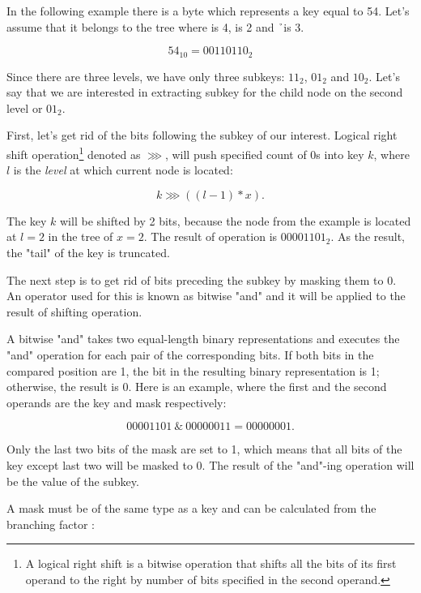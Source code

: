 In the following example there is a byte which represents a key equal to 54. Let's assume that it belongs to the tree where \m{} is 4, \x{} is 2 and \h\ is 3.

\begin{equation}
    54_{10} = 00110110_2
\end{equation}

Since there are three levels, we have only three subkeys: $11_2$, $01_2$ and $10_2$. Let's say that we are interested in extracting subkey for the child node on the second level or $01_2$.

First, let's get rid of the bits following the subkey of our interest. Logical right shift operation\footnote{A logical right shift is a bitwise operation that shifts all the bits of its first operand to the right by number of bits specified in the second operand.} denoted as $\ggg$, will push specified count of 0s into key $k$, where $l$ is the \emph{level} at which current node is located:

\begin{equation}
    k \ggg ((l - 1) * x).
\end{equation}

The key $k$ will be shifted by 2 bits, because the node from the example is located at $l = 2$ in the tree of $x = 2$. The result of operation is $00001101_2$. As the result, the "tail" of the key is truncated.

The next step is to get rid of bits preceding the subkey by masking them to 0. An operator used for this is known as bitwise "and" and it will be applied to the result of shifting operation.

A bitwise "and" takes two equal-length binary representations and executes the "and" operation for each pair of the corresponding bits. If both bits in the compared position are 1, the bit in the resulting binary representation is 1; otherwise, the result is 0. Here is an example, where the first and the second operands are the key and mask respectively:

\begin{equation}
    00001101 \ \& \ 00000011 = 00000001.
\end{equation}

Only the last two bits of the mask are set to 1, which means that all bits of the key except last two will be masked to 0. The result of the "and"-ing operation will be the value of the subkey.

A mask must be of the same type as a key and can be calculated from the branching factor \m:

